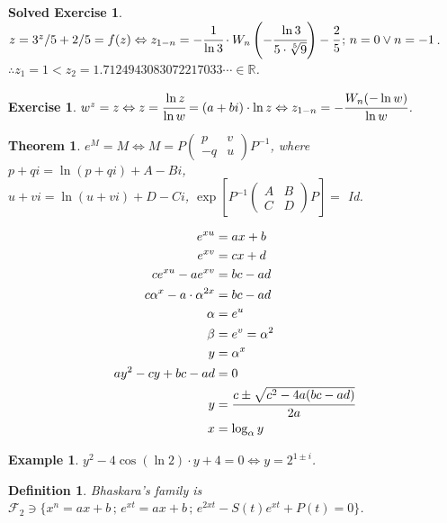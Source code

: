 \documentclass[12pt,a4paper]{article}
\newtheorem{exercise}{Exercise}[section]
\newtheorem{definition}{Definition}[section]
\newtheorem{thm}{Theorem}[section]
\newtheorem{example}{Example}[section]
\newtheorem*{solved}{Solved Exercise}
\begin{document}
\begin{solved}
$z = 3^z/5 + 2/5 = f(z) \Leftrightarrow z_{1 - n} = - \cfrac{1}{\ln 3} \cdot W_n \left( - \cfrac{\ln 3}{5 \cdot \sqrt[5]{9}} \right) - \cfrac{2}{5}\,;\,n = 0 \vee n = -1$. \\
$\therefore z_1 = 1 < z_2 = 1.7124943083072217033\cdots \in \mathbb{R}$.
\end{solved}

\begin{exercise}
$w^z = z \Leftrightarrow z = \cfrac{\ln z}{\ln w} = (a + bi) \cdot \ln z \Leftrightarrow z_{1-n} = - \cfrac{W_n(- \ln w)}{\ln w}$.
\end{exercise}

\begin{thm}
$e^M = M \Leftrightarrow M = P\left(\begin{matrix}p & v \\ -q & u \end{matrix}\right) P^{-1}$, where $p + qi = \ln (p + qi) + A - Bi$, \\
$u + vi = \ln (u + vi) + D - Ci$, $\exp \left[ P^{-1}\left(\begin{matrix}A & B \\ C & D \end{matrix}\right) P \right] =$ Id.
\end{thm}

\begin{align}
e^{xu} &= ax + b \\
e^{xv} &= cx + d \\
c e^{xu} - a e^{xv} &= bc - ad \\
c \alpha^x - a \cdot \alpha^{2x} &= bc - ad \\
\alpha &= e^u \\
\beta &= e^v = \alpha^2 \\
y &= \alpha^x \\
a y^2 - c y + bc - ad &= 0 \\
y &= \cfrac{c \pm \sqrt{c^2 - 4a(bc - ad)}}{2a} \\
x &= \log_{\alpha} y
\end{align}

\begin{example}
$y^2 - 4 \cos(\ln 2)\cdot y + 4 = 0 \Leftrightarrow y = 2^{1 \pm i}$.
\end{example}

\begin{definition}
Bhaskara's family is $\mathcal{F}_2 \ni \{ x^n = ax + b\,;\,e^{xt} = ax + b\,;\,e^{2xt} - S(t) e^{xt} + P(t) = 0 \}$.
\end{definition}
\end{document}
